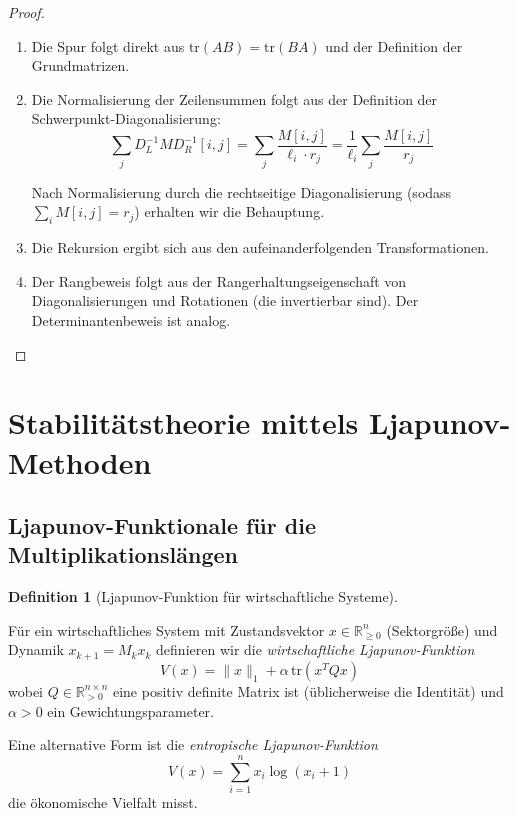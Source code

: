\documentclass[a4paper,12pt]{article}
\theoremstyle{definition}
\newtheorem{definition}{Definition}
\begin{document}
\begin{proof}

\begin{enumerate}
\item Die Spur folgt direkt aus $\mathrm{tr}(AB) = \mathrm{tr}(BA)$ und der Definition der Grundmatrizen.

\item Die Normalisierung der Zeilensummen folgt aus der Definition der Schwerpunkt-Diagonalisierung:
\[
\sum_j D_L^{-1} M D_R^{-1}[i,j] = \sum_j \frac{M[i,j]}{\ell_i \cdot r_j} = \frac{1}{\ell_i} \sum_j \frac{M[i,j]}{r_j}
\]

Nach Normalisierung durch die rechtseitige Diagonalisierung (sodass $\sum_i M[i,j] = r_j$) erhalten wir die Behauptung.

\item Die Rekursion ergibt sich aus den aufeinanderfolgenden Transformationen.

\item Der Rangbeweis folgt aus der Rangerhaltungseigenschaft von Diagonalisierungen und Rotationen (die invertierbar sind). Der Determinantenbeweis ist analog.

\end{enumerate}

\end{proof}

\section{Stabilitätstheorie mittels Ljapunov-Methoden}

\subsection{Ljapunov-Funktionale für die Multiplikationslängen}

\begin{definition}[Ljapunov-Funktion für wirtschaftliche Systeme]
\label{def:ljapunov_wirtschaft}

Für ein wirtschaftliches System mit Zustandsvektor $x \in \mathbb{R}^n_{\geq 0}$ (Sektorgröße) und Dynamik $x_{k+1} = M_k x_k$ definieren wir die \emph{wirtschaftliche Ljapunov-Funktion}
\[
V(x) = \|x\|_1 + \alpha \, \mathrm{tr}(x^T Q x)
\]
wobei $Q \in \mathbb{R}^{n \times n}_{>0}$ eine positiv definite Matrix ist (üblicherweise die Identität) und $\alpha > 0$ ein Gewichtungsparameter.

Eine alternative Form ist die \emph{entropische Ljapunov-Funktion}
\[
V(x) = \sum_{i=1}^n x_i \log(x_i + 1)
\]
die ökonomische Vielfalt misst.
\end{definition}
\end{document}
